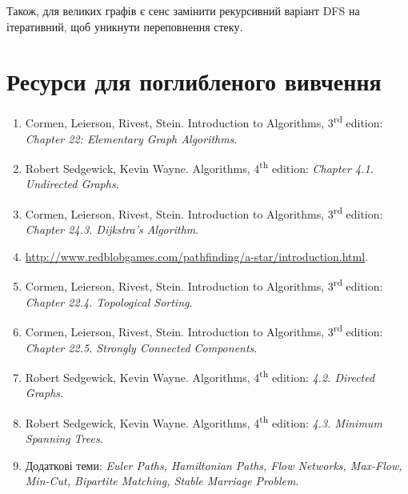 \documentclass[12pt,a4paper]{report}
\begin{document}
Також, для великих графів є сенс замінити рекурсивний варіант DFS на ітеративний, щоб уникнути переповнення стеку.





\section*{Ресурси для поглибленого вивчення}
\begin{enumerate}
    \item Cormen, Leierson, Rivest, Stein. Introduction to Algorithms, 3\textsuperscript{rd} edition: {\itshape Chapter 22: Elementary Graph Algorithms}.
    \item Robert Sedgewick, Kevin Wayne. Algorithms, 4\textsuperscript{th} edition: {\itshape Chapter 4.1. Undirected Graphs}.
    \item Cormen, Leierson, Rivest, Stein. Introduction to Algorithms, 3\textsuperscript{rd} edition: {\itshape Chapter 24.3. Dijkstra’s Algorithm}.
    \item \href{http://www.redblobgames.com/pathfinding/a-star/introduction.html}{http://www.redblobgames.com/pathfinding/a-star/introduction.html}.
    \item Cormen, Leierson, Rivest, Stein. Introduction to Algorithms, 3\textsuperscript{rd} edition: {\itshape Chapter 22.4. Topological Sorting}.
    \item Cormen, Leierson, Rivest, Stein. Introduction to Algorithms, 3\textsuperscript{rd} edition: {\itshape Chapter 22.5. Strongly Connected Components}.
    \item Robert Sedgewick, Kevin Wayne. Algorithms, 4\textsuperscript{th} edition: {\itshape 4.2. Directed Graphs}.
    \item Robert Sedgewick, Kevin Wayne. Algorithms, 4\textsuperscript{th} edition: {\itshape 4.3. Minimum Spanning Trees}.
    \item Додаткові теми: {\itshape Euler Paths, Hamiltonian Paths, Flow Networks, Max-Flow, Min-Cut, Bipartite Matching, Stable Marriage Problem}.
\end{enumerate}
\end{document}
